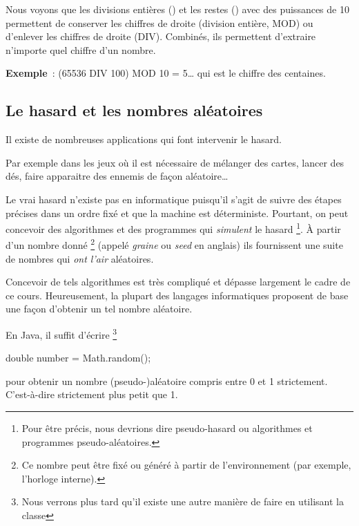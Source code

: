 			Nous voyons que les divisions entières () et les restes
			() avec des puissances de 10 permettent de conserver les
			chiffres de droite (division entière, MOD) ou d'enlever les chiffres
			de droite (DIV).  Combinés, ils permettent d’extraire n’importe quel
			chiffre d’un nombre.
			
			\textbf{Exemple}~: (65536 DIV 100) MOD 10 = 5… qui est le chiffre des
			centaines. 


		
		\subsection{Le hasard et les nombres aléatoires}
		\label{hasard}
			
			Il existe de nombreuses applications qui font intervenir le hasard.
		
			Par exemple dans les jeux où il est nécessaire de mélanger des
			cartes, lancer des dés, faire apparaitre des ennemis de façon
			aléatoire\dots
			
			Le vrai hasard n’existe pas en informatique
			puisqu’il s’agit de suivre des étapes précises
			dans un ordre fixé et que la machine est déterministe. 
			Pourtant, on peut concevoir des algorithmes et des programmes 
			qui \emph{simulent} le hasard%
			\footnote{%
				Pour être précis, nous devrions dire pseudo-hasard
				ou algorithmes et programmes pseudo-aléatoires.
			}.
			À partir d’un nombre donné%
			\footnote{%
				Ce nombre peut être fixé ou généré à partir
				de l’environnement 
				(par exemple, l’horloge interne).
			}
			(appelé \emph{graine} ou \emph{seed} en anglais)
			ils fournissent une suite de nombres qui \emph{ont l’air}
			aléatoires.			

			Concevoir de tels algorithmes est très compliqué et dépasse
			largement le cadre de ce cours.  Heureusement, la plupart des
			langages informatiques proposent de base une façon d'obtenir un tel
			nombre aléatoire.

			En Java, il suffit d'écrire
			\footnote{Nous verrons plus tard qu'il existe une autre manière 
				de faire en utilisant la classe }

			\begin{java}
double number = Math.random();				
			\end{java}

			pour obtenir un nombre (pseudo-)aléatoire compris entre 0 et 1 
			strictement. C'est-à-dire strictement plus petit que 1. 

